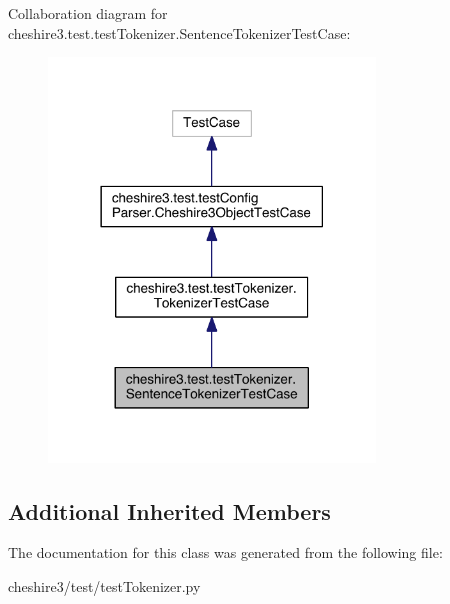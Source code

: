 Collaboration diagram for cheshire3.\-test.\-test\-Tokenizer.\-Sentence\-Tokenizer\-Test\-Case\-:
\nopagebreak
\begin{figure}[H]
\begin{center}
\leavevmode
\includegraphics[width=246pt]{classcheshire3_1_1test_1_1test_tokenizer_1_1_sentence_tokenizer_test_case__coll__graph}
\end{center}
\end{figure}
\subsection*{Additional Inherited Members}


The documentation for this class was generated from the following file\-:\begin{DoxyCompactItemize}
\item 
cheshire3/test/test\-Tokenizer.\-py\end{DoxyCompactItemize}
